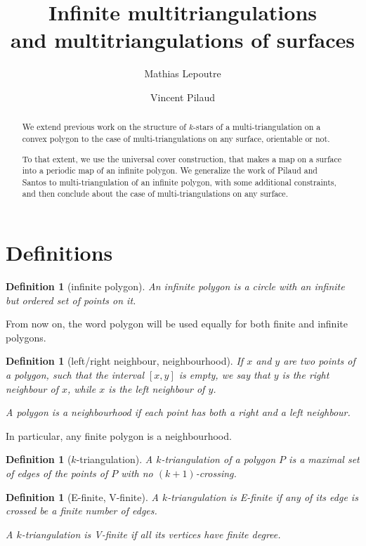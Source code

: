 \documentclass{amsart}
\title[Infinite multitriangulations and multitriangulations of surfaces]{Infinite multitriangulations \\ and multitriangulations of surfaces}
\author{Mathias Lepoutre}
\author{Vincent Pilaud}
\newtheorem{definition}[theorem]{Definition}
\theoremstyle{remark}
\newcommand{\darkblue}{\color{darkblue}} %
\newcommand{\defn}[1]{\textsl{\darkblue #1}} %
\newcommand*{\nbd}[0]{neighbourhood\xspace}
\newcommand*{\ef}[0]{E-finite\xspace}
\newcommand*{\vf}[0]{V-finite\xspace}
\newcommand*{\ktg}[0]{$k$-triangulation\xspace}
\begin{document}
\begin{abstract}
We extend previous work on the structure of $k$-stars of a multi-triangulation on a convex polygon to the case of multi-triangulations on any surface, orientable or not. 

To that extent, we use the universal cover construction, that makes a map on a surface into a periodic map of an infinite polygon. We generalize the work of Pilaud and Santos to multi-triangulation of an infinite polygon, with some additional constraints, and then conclude about the case of multi-triangulations on any surface.
\end{abstract}

\maketitle

\section{Definitions}


\begin{definition}[infinite polygon]
An \defn{infinite polygon} is a circle with an infinite but ordered set of points on it.
\end{definition} 

From now on, the word polygon will be used equally for both finite and infinite polygons.

\begin{definition}[left/right neighbour, \nbd]
If $x$ and $y$ are two points of a polygon, such that the interval $[x,y]$ is empty, we say that $y$ is the \defn{right neighbour} of $x$, while $x$ is the \defn{left neighbour} of $y$.

A polygon is a \nbd if each point has both a right and a left neighbour.
\end{definition}

In particular, any finite polygon is a \nbd.

\begin{definition}[\ktg]
A \defn{\ktg} of a polygon $P$ is a maximal set of edges of the points of $P$ with no $(k+1)$-crossing.
\end{definition}

\begin{definition}[\ef, \vf]
A \ktg is \defn{\ef} if any of its edge is crossed be a finite number of edges.

A \ktg is \defn{\vf} if all its vertices have finite degree.
\end{definition}
\end{document}
